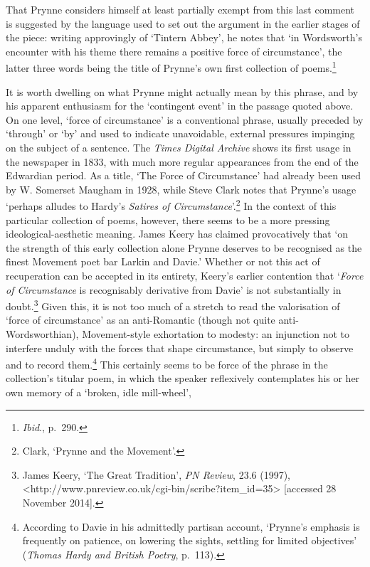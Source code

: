 \documentclass[]{article}
\begin{document}
\noindent That Prynne considers himself at least partially exempt from
this last comment is suggested by the language used to set out the
argument in the earlier stages of the piece: writing approvingly of
`Tintern Abbey', he notes that `in Wordsworth's encounter with his theme
there remains a positive force of circumstance', the latter three words
being the title of Prynne's own first collection of poems.\footnote{\emph{Ibid}.,
  p.~290.}

It is worth dwelling on what Prynne might actually mean by this phrase,
and by his apparent enthusiasm for the `contingent event' in the passage
quoted above. On one level, `force of circumstance' is a conventional
phrase, usually preceded by `through' or `by' and used to indicate
unavoidable, external pressures impinging on the subject of a sentence.
The \emph{Times Digital Archive} shows its first usage in the newspaper
in 1833, with much more regular appearances from the end of the
Edwardian period. As a title, `The Force of Circumstance' had already
been used by W. Somerset Maugham in 1928, while Steve Clark notes that
Prynne's usage `perhaps alludes to Hardy's \emph{Satires of
Circumstance}'.\footnote{Clark, `Prynne and the Movement'.} In the
context of this particular collection of poems, however, there seems to
be a more pressing ideological-aesthetic meaning. James Keery has
claimed provocatively that `on the strength of this early collection
alone Prynne deserves to be recognised as the finest Movement poet bar
Larkin and Davie.' Whether or not this act of recuperation can be
accepted in its entirety, Keery's earlier contention that `\emph{Force
of Circumstance} is recognisably derivative from Davie' is not
substantially in doubt.\footnote{James Keery, `The Great Tradition',
  \emph{PN Review}, 23.6 (1997),
  \textless{}http://www.pnreview.co.uk/cgi-bin/scribe?item\_id=35\textgreater{}
  {[}accessed 28 November 2014{]}.} Given this, it is not too much of a
stretch to read the valorisation of `force of circumstance' as an
anti-Romantic (though not quite anti-Wordsworthian), Movement-style
exhortation to modesty: an injunction not to interfere unduly with the
forces that shape circumstance, but simply to observe and to record
them.\footnote{According to Davie in his admittedly partisan account,
  `Prynne's emphasis is frequently on patience, on lowering the sights,
  settling for limited objectives' (\emph{Thomas Hardy and British
  Poetry}, p.~113).} This certainly seems to be force of the phrase in
the collection's titular poem, in which the speaker reflexively
contemplates his or her own memory of a `broken, idle mill-wheel',
\end{document}
